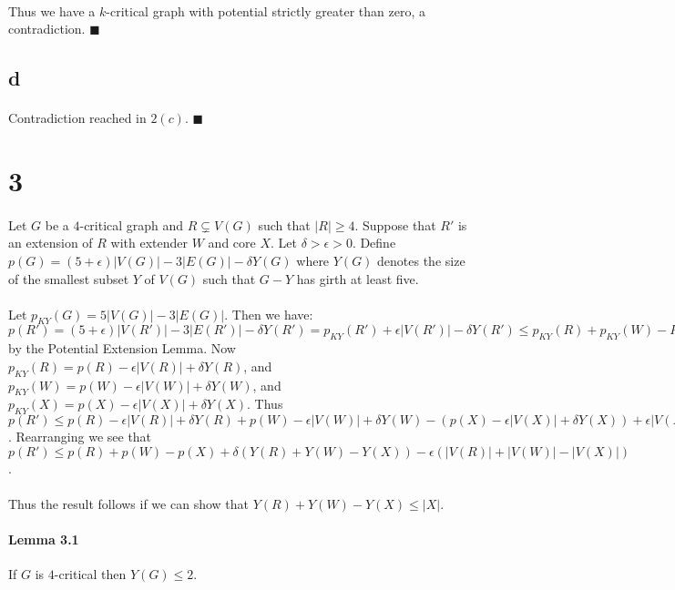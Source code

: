 \documentclass[letterpaper,12pt,oneside,onecolumn]{report}
\begin{document}
\paragraph{}
Thus we have a $k$-critical graph with potential strictly greater than zero, a contradiction. $\blacksquare$
\subsection*{d}
\paragraph{}
Contradiction reached in $2(c)$. $\blacksquare$
\section*{3}
\paragraph{}
Let $G$ be a $4$-critical graph and $R \subsetneq V(G)$ such that $|R| \geq 4$. Suppose that $R'$ is an extension of $R$ with extender $W$ and core $X$. Let $\delta > \epsilon > 0$. Define $p(G) = (5 + \epsilon)|V(G)| - 3|E(G)| - \delta Y(G)$ where $Y(G)$ denotes the size of the smallest subset $Y$ of $V(G)$ such that $G-Y$ has girth at least five. 
\paragraph{}
Let $p_{KY}(G) = 5|V(G)| - 3|E(G)|$. Then we have: $p(R') = (5 + \epsilon)|V(R')| - 3|E(R')| - \delta Y(R') = p_{KY}(R') + \epsilon |V(R')| - \delta Y(R') \leq p_{KY}(R) + p_{KY}(W) -P_{KY}(X) + \epsilon|V(R')| - \delta Y(R')$ by the Potential Extension Lemma. Now $p_{KY}(R) = p(R) - \epsilon|V(R)| + \delta Y(R)$, and $p_{KY}(W) = p(W) - \epsilon|V(W)| + \delta Y(W)$, and $p_{KY}(X) = p(X) - \epsilon|V(X)| + \delta Y(X)$. Thus $p(R') \leq p(R) - \epsilon|V(R)| + \delta Y(R) + p(W) - \epsilon|V(W)| + \delta Y(W) - (p(X) - \epsilon|V(X)| + \delta Y(X)) + \epsilon|V(R')| -\delta Y(R')$. Rearranging we see that $p(R') \leq  p(R) + p(W) - p(X) + \delta (Y(R) + Y(W) - Y(X)) - \epsilon(|V(R)| + |V(W)| - |V(X)|)$.
\paragraph{}
Thus the result follows if we can show that $Y(R) + Y(W) - Y(X) \leq |X|$.
\paragraph{Lemma 3.1}
If $G$ is $4$-critical then $Y(G) \leq 2$.
\end{document}
